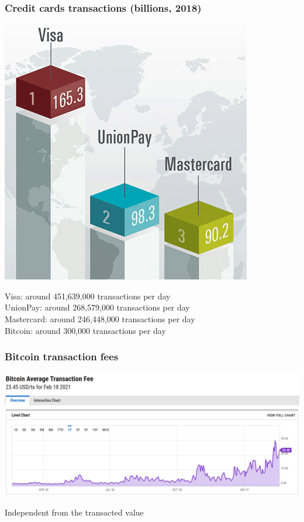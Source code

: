 \documentclass[11pt]{beamer}  %
\begin{document}
\begin{frame}\frametitle{Credit cards transactions (billions, 2018)}

  \begin{center}
    \includegraphics[scale=0.3,clip=false]{pictures/credit-cards.png}
  \end{center}

  \begin{center}
    Visa: around 451,639,000 transactions per day\\
    UnionPay: around 268,579,000 transactions per day\\
    Mastercard: around 246,448,000 transactions per day\\
    Bitcoin: around 300,000 transactions per day
  \end{center}

\end{frame}

\begin{frame}\frametitle{Bitcoin transaction fees}

  \begin{center}
    \includegraphics[width=\textwidth,clip=false]{pictures/bitcoin-fees.png}
  \end{center}

  \begin{center}
    Independent from the transacted value
  \end{center}

\end{frame}
\end{document}
